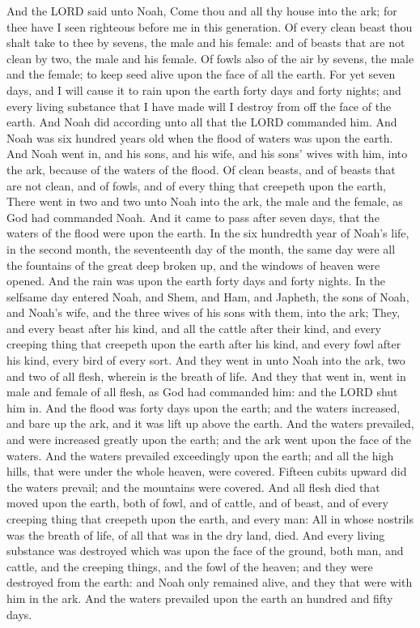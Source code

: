 \begin{biblechapter} %
\verse And the LORD said unto Noah, Come thou and all thy house into the ark; for thee have I seen righteous before me in this generation.
\verse Of every clean beast thou shalt take to thee by sevens, the male and his female: and of beasts that are not clean by two, the male and his female.
\verse Of fowls also of the air by sevens, the male and the female; to keep seed alive upon the face of all the earth.
\verse For yet seven days, and I will cause it to rain upon the earth forty days and forty nights; and every living substance that I have made will I destroy from off the face of the earth.
\verse And Noah did according unto all that the LORD commanded him.
\verse And Noah was six hundred years old when the flood of waters was upon the earth.
\verse And Noah went in, and his sons, and his wife, and his sons' wives with him, into the ark, because of the waters of the flood.
\verse Of clean beasts, and of beasts that are not clean, and of fowls, and of every thing that creepeth upon the earth,
\verse There went in two and two unto Noah into the ark, the male and the female, as God had commanded Noah.
\verse And it came to pass after seven days, that the waters of the flood were upon the earth.
\verse In the six hundredth year of Noah's life, in the second month, the seventeenth day of the month, the same day were all the fountains of the great deep broken up, and the windows of heaven were opened.
\verse And the rain was upon the earth forty days and forty nights.
\verse In the selfsame day entered Noah, and Shem, and Ham, and Japheth, the sons of Noah, and Noah's wife, and the three wives of his sons with them, into the ark;
\verse They, and every beast after his kind, and all the cattle after their kind, and every creeping thing that creepeth upon the earth after his kind, and every fowl after his kind, every bird of every sort.
\verse And they went in unto Noah into the ark, two and two of all flesh, wherein is the breath of life.
\verse And they that went in, went in male and female of all flesh, as God had commanded him: and the LORD shut him in.
\verse And the flood was forty days upon the earth; and the waters increased, and bare up the ark, and it was lift up above the earth.
\verse And the waters prevailed, and were increased greatly upon the earth; and the ark went upon the face of the waters.
\verse And the waters prevailed exceedingly upon the earth; and all the high hills, that were under the whole heaven, were covered.
\verse Fifteen cubits upward did the waters prevail; and the mountains were covered.
\verse And all flesh died that moved upon the earth, both of fowl, and of cattle, and of beast, and of every creeping thing that creepeth upon the earth, and every man:
\verse All in whose nostrils was the breath of life, of all that was in the dry land, died.
\verse And every living substance was destroyed which was upon the face of the ground, both man, and cattle, and the creeping things, and the fowl of the heaven; and they were destroyed from the earth: and Noah only remained alive, and they that were with him in the ark.
\verse And the waters prevailed upon the earth an hundred and fifty days.
\end{biblechapter}

